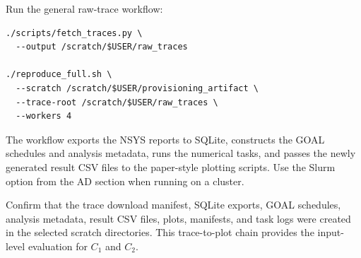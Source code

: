 \documentclass[conference]{IEEEtran}
\begin{document}
\artcomp

Run the general raw-trace workflow:

\begin{verbatim}
./scripts/fetch_traces.py \
  --output /scratch/$USER/raw_traces

./reproduce_full.sh \
  --scratch /scratch/$USER/provisioning_artifact \
  --trace-root /scratch/$USER/raw_traces \
  --workers 4
\end{verbatim}

The workflow exports the NSYS reports to SQLite, constructs the GOAL
schedules and analysis metadata, runs the numerical tasks, and passes the
newly generated result CSV files to the paper-style plotting scripts.
Use the Slurm option from the AD section when running on a cluster.

\artout

Confirm that the trace download manifest, SQLite exports, GOAL schedules,
analysis metadata, result CSV files, plots, manifests, and task logs were
created in the selected scratch directories. This trace-to-plot chain
provides the input-level evaluation for $C_1$ and $C_2$.
\end{document}
